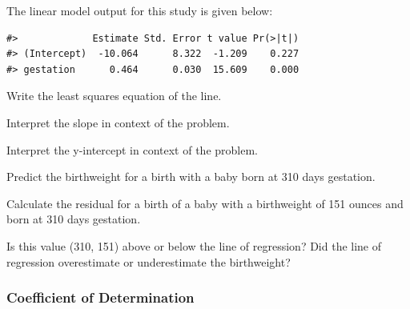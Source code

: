 \documentclass[
]{report}
\newenvironment{Shaded}{\begin{snugshade}}{\end{snugshade}}
\newcommand{\AttributeTok}[1]{\textcolor[rgb]{0.13,0.29,0.53}{#1}}
\newcommand{\CommentTok}[1]{\textcolor[rgb]{0.56,0.35,0.01}{\textit{#1}}}
\newcommand{\DecValTok}[1]{\textcolor[rgb]{0.00,0.00,0.81}{#1}}
\newcommand{\FunctionTok}[1]{\textcolor[rgb]{0.13,0.29,0.53}{\textbf{#1}}}
\newcommand{\NormalTok}[1]{#1}
\newcommand{\OtherTok}[1]{\textcolor[rgb]{0.56,0.35,0.01}{#1}}
\newcommand{\SpecialCharTok}[1]{\textcolor[rgb]{0.81,0.36,0.00}{\textbf{#1}}}
\begin{document}
The linear model output for this study is given below:

\begin{Shaded}
\end{Shaded}

\begin{verbatim}
#>             Estimate Std. Error t value Pr(>|t|)
#> (Intercept)  -10.064      8.322  -1.209    0.227
#> gestation      0.464      0.030  15.609    0.000
\end{verbatim}

Write the least squares equation of the line.

\vspace{0.6in}

Interpret the slope in context of the problem.

\vspace{0.6in}

Interpret the y-intercept in context of the problem.

\vspace{0.6in}

Predict the birthweight for a birth with a baby born at 310 days gestation.

\vspace{0.5in}

Calculate the residual for a birth of a baby with a birthweight of 151 ounces and born at 310 days gestation.

\vspace{0.5in}

Is this value (310, 151) above or below the line of regression? Did the line of regression overestimate or underestimate the birthweight?

\vspace{0.2in}

\subsubsection*{Coefficient of Determination}\label{coefficient-of-determination}
\end{document}
